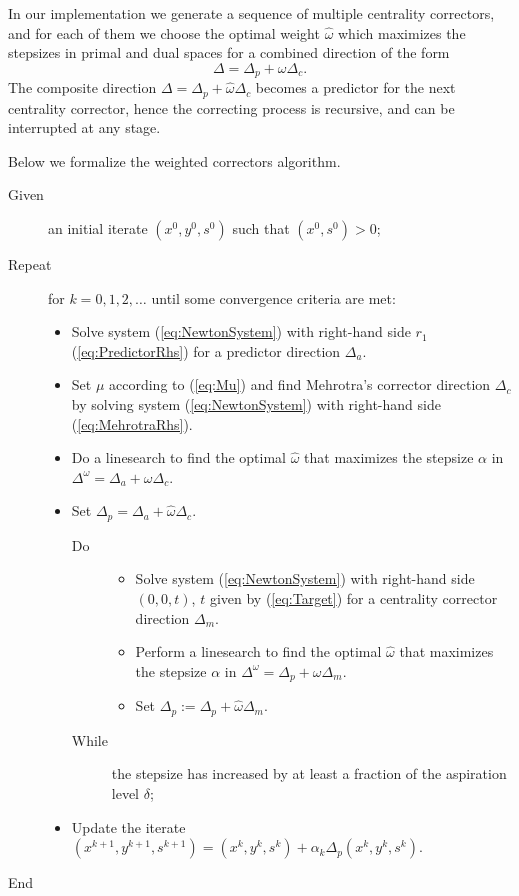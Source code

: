 
In our implementation we generate a sequence of multiple centrality 
correctors, and for each of them we choose the optimal weight 
$\hat \omega$ which maximizes the stepsizes in primal and dual spaces 
for a combined direction of the form
\[
  \Delta = \Delta_p + \omega \Delta_c.
\]
The composite direction $\Delta = \Delta_p + \hat \omega \Delta_c$ becomes
a predictor for the next centrality corrector, hence the correcting process
is recursive, and can be interrupted at any stage.

Below we formalize the weighted correctors algorithm.
\begin{description}
\item[Given] an initial iterate $(x^0,y^0,s^0)$ such that $(x^0, s^0) > 0$;
\item[Repeat] for $k=0,1,2,\ldots$ until some convergence criteria are met:
  \begin{itemize}
  \item Solve system (\ref{eq:NewtonSystem}) with right-hand side $r_1$
        (\ref{eq:PredictorRhs}) for a predictor direction $\Delta_a$.

  \item Set $\mu$ according to (\ref{eq:Mu}) and find Mehrotra's corrector 
        direction $\Delta_c$ by solving system (\ref{eq:NewtonSystem}) 
        with right-hand side (\ref{eq:MehrotraRhs}).

  \item Do a linesearch to find the optimal $\hat\omega$ that maximizes 
        the stepsize $\alpha$ in $\Delta^\omega = \Delta_a +\omega\Delta_c$.

  \item Set $\Delta_p = \Delta_a +\hat\omega\Delta_c$. 
    \begin{description}
    \item[Do]
      \begin{itemize}
      \item Solve system (\ref{eq:NewtonSystem}) with right-hand side
	$(0,0,t)$, $t$ given by (\ref{eq:Target}) for a centrality corrector
	direction $\Delta_m$.
      \item Perform a linesearch to find the optimal $\hat\omega$ that maximizes 
        the stepsize $\alpha$ in $\Delta^\omega = \Delta_p +\omega\Delta_m$.
      \item Set $\Delta_p := \Delta_p +\hat\omega\Delta_m$. 
	\end{itemize}
    \item[While] the stepsize has increased by at least a fraction of the aspiration level $\delta$;
    \end{description}
  \item Update the iterate $(x^{k+1},y^{k+1},s^{k+1}) = (x^k,y^k,s^k) + \alpha_k\Delta_p (x^k,y^k,s^k).$
  \end{itemize}
\item[End]
\end{description}

